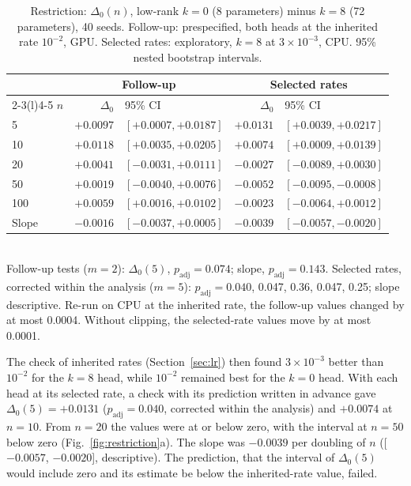 \documentclass{ieeeaccess}
\begin{document}
\begin{table}[t]
\caption{Restriction: $\Delta_0(n)$, low-rank $k=0$ (8 parameters) minus $k=8$ (72 parameters), 40 seeds. Follow-up: prespecified, both heads at the inherited rate $10^{-2}$, GPU. Selected rates: exploratory, $k=8$ at $3\times10^{-3}$, CPU. 95\% nested bootstrap intervals.}
\label{tab:followups}
\centering
\setlength{\tabcolsep}{3pt}
\footnotesize
\begin{tabular}{@{}lrlrl@{}}
\toprule
 & \multicolumn{2}{c}{Follow-up} & \multicolumn{2}{c}{Selected rates}\\
\cmidrule(lr){2-3}\cmidrule(l){4-5}
$n$ & $\Delta_0$ & 95\% CI & $\Delta_0$ & 95\% CI\\
\midrule
5 & $+0.0097$ & $[+0.0007,+0.0187]$ & $+0.0131$ & $[+0.0039,+0.0217]$\\
10 & $+0.0118$ & $[+0.0035,+0.0205]$ & $+0.0074$ & $[+0.0009,+0.0139]$\\
20 & $+0.0041$ & $[-0.0031,+0.0111]$ & $-0.0027$ & $[-0.0089,+0.0030]$\\
50 & $+0.0019$ & $[-0.0040,+0.0076]$ & $-0.0052$ & $[-0.0095,-0.0008]$\\
100 & $+0.0059$ & $[+0.0016,+0.0102]$ & $-0.0023$ & $[-0.0064,+0.0012]$\\
\midrule
Slope & $-0.0016$ & $[-0.0037,+0.0005]$ & $-0.0039$ & $[-0.0057,-0.0020]$\\
\bottomrule
\end{tabular}
\\[2pt]{\scriptsize Follow-up tests ($m=2$): $\Delta_0(5)$, $p_{\mathrm{adj}}=0.074$; slope, $p_{\mathrm{adj}}=0.143$. Selected rates, corrected within the analysis ($m=5$): $p_{\mathrm{adj}}=0.040$, 0.047, 0.36, 0.047, 0.25; slope descriptive. Re-run on CPU at the inherited rate, the follow-up values changed by at most 0.0004. Without clipping, the selected-rate values move by at most 0.0001.}
\end{table}

The check of inherited rates (Section~\ref{sec:lr}) then found $3\times10^{-3}$ better than $10^{-2}$ for the $k=8$ head, while $10^{-2}$ remained best for the $k=0$ head. With each head at its selected rate, a check with its prediction written in advance gave $\Delta_0(5)=+0.0131$ ($p_{\mathrm{adj}}=0.040$, corrected within the analysis) and $+0.0074$ at $n=10$. From $n=20$ the values were at or below zero, with the interval at $n=50$ below zero (Fig.~\ref{fig:restriction}a). The slope was $-0.0039$ per doubling of $n$ ([$-0.0057$, $-0.0020$], descriptive). The prediction, that the interval of $\Delta_0(5)$ would include zero and its estimate be below the inherited-rate value, failed.
\end{document}
